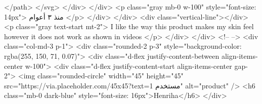                       </path>
                    </svg>
                  </div>
                </div>
                <p class="gray mb-0 w-100" style="font-size: 14px">
                  منذ ٣ أعوام
                </p>
              </div>
            </div>
            <div class="vertical-line"></div>
            <p class="gray text-start mt-2">
              I like the way this product makes my skin feel however it does not
              work as shown in videos
            </p>
          </div>
        </div>
        <!--  -->
        <div class="col-md-3 p-1">
          <div class="rounded-2 p-3" style="background-color: rgba(255, 150, 71, 0.07)">
            <div class="d-flex justify-content-between align-items-center w-100">
              <div class="d-flex justify-content-start align-items-center gap-2">
                <img class="rounded-circle" width="45" height="45"
                  src="https://via.placeholder.com/45x45?text=مستخدم 1" alt="product" />
                <h6 class="mb-0 dark-blue" style="font-size: 16px">Henriha</h6>
              </div>

